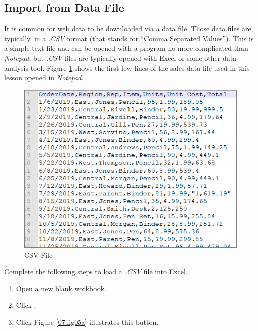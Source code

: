 \subsection{Import from Data File}\label{07:ImportFromDataFile}

It is common for web data to be downloaded via a data file. Those data files are, typically, in a \textit{.CSV} format (that stands for ``Comma Separated Values''). This is a simple text file and can be opened with a program no more complicated than \textit{Notepad}; but \textit{.CSV} files are typically opened with Excel or some other data analysis tool. Figure \ref{07:fig04} shows the first few lines of the sales data file used in this lesson opened in \textit{Notepad}.

\begin{figure}[H]
	\centering
	\includegraphics[width=\maxwidth{.95\linewidth}]{gfx/ch07_fig04}
	\caption{CSV File}
	\label{07:fig04}
\end{figure}

Complete the following steps to load a \textit{.CSV} file into Excel.

\begin{enumerate}
	\item Open a new blank workbook.
	\item {} Click .
	\item {} Click 
	Figure \ref{07:fig05a} illustrates this button.
\end{enumerate}

